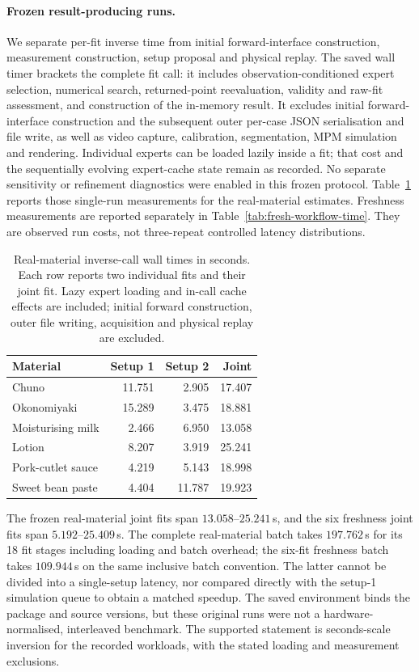 \paragraph{Frozen result-producing runs.}
We separate per-fit inverse time from initial forward-interface
construction, measurement construction, setup proposal and physical
replay. The saved wall timer brackets the complete fit call: it includes
observation-conditioned expert selection, numerical search, returned-point
reevaluation, validity and raw-fit assessment, and construction of the
in-memory result. It excludes initial forward-interface construction
and the subsequent outer per-case JSON serialisation and file write,
as well as video capture, calibration, segmentation, MPM simulation
and rendering. Individual experts can be loaded lazily inside a fit;
that cost and the sequentially evolving expert-cache state remain as
recorded. No separate sensitivity or refinement diagnostics were enabled
in this frozen protocol. Table~\ref{tab:time-budget} reports those
single-run measurements for the real-material estimates. Freshness
measurements are reported separately in Table~\ref{tab:fresh-workflow-time}. They are observed run costs, not
three-repeat controlled latency distributions.

\begin{table}[!htbp]
\centering\small
\setlength{\tabcolsep}{4pt}
\caption{Real-material inverse-call wall times in seconds. Each row reports two individual fits and their joint fit. Lazy expert loading and in-call cache effects are included; initial forward construction, outer file writing, acquisition and physical replay are excluded.}
\label{tab:time-budget}
\begin{tabular}{@{}lrrr@{}}
\toprule
Material & Setup 1 & Setup 2 & Joint \\
\midrule
Chuno & 11.751 & 2.905 & 17.407 \\
Okonomiyaki & 15.289 & 3.475 & 18.881 \\
Moisturising milk & 2.466 & 6.950 & 13.058 \\
Lotion & 8.207 & 3.919 & 25.241 \\
Pork-cutlet sauce & 4.219 & 5.143 & 18.998 \\
Sweet bean paste & 4.404 & 11.787 & 19.923 \\
\bottomrule
\end{tabular}
\end{table}

The frozen real-material joint fits span $13.058$--$25.241$\,s,
and the six freshness joint fits span $5.192$--$25.409$\,s.
The complete real-material batch takes $197.762$\,s for its 18 fit
stages including loading and batch overhead; the six-fit freshness
batch takes $109.944$\,s on the same inclusive batch convention.
The latter cannot be divided into a single-setup latency, nor compared
directly with the setup-1 simulation queue to obtain a matched speedup.
The saved environment binds the package and source versions, but these
original runs were not a hardware-normalised, interleaved benchmark.
The supported statement is seconds-scale inversion for the recorded
workloads, with the stated loading and measurement exclusions.


